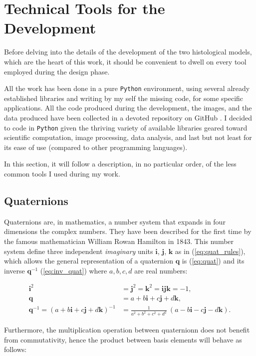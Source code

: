 \section{Technical Tools for the Development} \label{sec:tech_tool}
Before delving into the details of the development of the two histological models, which are the heart of this work, it should be convenient to dwell on every tool employed during the design phase.

All the work has been done in a pure \texttt{Python} environment, using several already established libraries and writing by my self the missing code, for some specific applications. All the code produced during the development, the images, and the data produced have been collected in a devoted repository on GitHub \cite{repo}. I decided to code in \texttt{Python} given the thriving variety of available libraries geared toward scientific computation, image processing, data analysis, and last but not least for its ease of use (compared to other programming languages).

In this section, it will follow a description, in no particular order, of the less common tools I used during my work.

\subsection{Quaternions} \label{ssec:quat}
Quaternions are, in mathematics, a number system that expands in four dimensions the complex numbers. They have been described for the first time by the famous mathematician William Rowan Hamilton in 1843. This number system define three independent \textit{imaginary} units $\bm{i}$, $\bm{j}$, $\bm{k}$ as in (\ref{eq:quat_rules}), which allows the general representation of a quaternion $\bm{q}$ is (\ref{eq:quat}) and its inverse $\bm{q}^{-1}$ (\ref{eq:inv_quat}) where $a,b,c,d$ are real numbers:

\begin{align}
    \bm{i}^2 & = \bm{j}^2 = \bm{k}^2 = \bm{i}\bm{j}\bm{k} = -1, \label{eq:quat_rules}\\
    \bm{q} & = a + b\bm{i} + c\bm{j} + d\bm{k}, \label{eq:quat}\\
    \bm{q}^{-1 } = (a + b\bm{i} + c\bm{j} + d\bm{k})^{-1} & = \frac{1}{a^2 + b^2 + c^2 +d^2}\ (a - b\bm{i} - c\bm{j} - d\bm{k}). \label{eq:inv_quat}
\end{align}

Furthermore, the multiplication operation between quaternionn does not benefit from commutativity, hence the product between basis elements will behave as follows:

